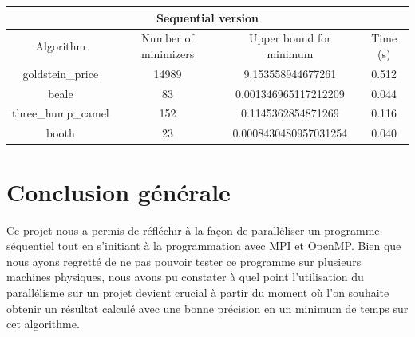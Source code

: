 \documentclass[a4paper,10pt]{article}
\begin{document}
\begin{tabular}{|c|c|c|c|}
\hline
\multicolumn{4}{|c|}{Sequential version}\\
\hline
Algorithm & Number of minimizers & Upper bound for minimum & Time (s) \\
\hline
goldstein\_price & 14989 & 9.153558944677261 & 0.512\\
\hline
beale & 83 & 0.001346965117212209 & 0.044\\
\hline
three\_hump\_camel & 152 & 0.1145362854871269 & 0.116\\
\hline
booth & 23 & 0.0008430480957031254 & 0.040\\
\hline
\end{tabular}


\newpage
\section{Conclusion générale}
Ce projet nous a permis de réfléchir à la façon de paralléliser un programme séquentiel tout en s'initiant à la programmation avec MPI et OpenMP. 
Bien que nous ayons regretté de ne pas pouvoir tester ce programme 
sur plusieurs machines physiques, nous avons pu constater 
à quel point l'utilisation du parallélisme sur un projet 
devient crucial à partir du moment où l'on souhaite obtenir un résultat calculé
avec une bonne précision en un minimum de temps sur cet algorithme. 
\end{document}
